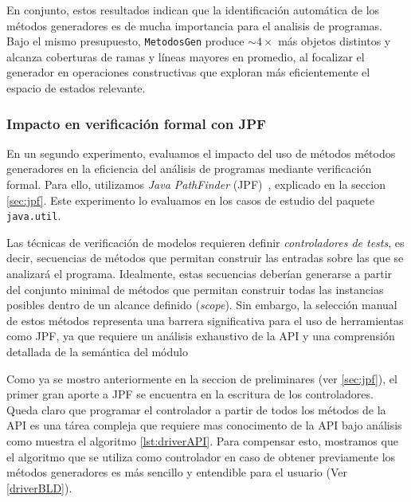 En conjunto, estos resultados indican que la identificación automática de
los métodos generadores es de mucha importancia para el analisis de programas.
Bajo el mismo presupuesto, \texttt{MetodosGen} produce \(\sim 4\times\)
más objetos distintos y alcanza coberturas de ramas y líneas mayores en promedio,
al focalizar el generador en operaciones constructivas que exploran más
eficientemente el espacio de estados relevante.



\subsubsection{Impacto en verificación formal con JPF}

En un segundo experimento, evaluamos el impacto del uso de métodos métodos generadores en la eficiencia 
del análisis de programas mediante verificación formal. Para ello, utilizamos \emph{Java PathFinder} 
(JPF)~\cite{Visser:2005}, explicado en la seccion \ref{sec:jpf}.
Este experimento lo evaluamos en los casos de estudio del paquete \texttt{java.util}.

Las técnicas de verificación de modelos requieren definir \emph{controladores de tests}, es decir, 
secuencias de métodos que permitan construir las entradas sobre las que se analizará el programa. 
Idealmente, estas secuencias deberían generarse a partir del conjunto minimal de métodos que permitan 
construir todas las instancias posibles dentro de un alcance definido (\emph{scope}). Sin embargo, 
la selección manual de estos métodos representa una barrera significativa para el uso de herramientas 
como JPF, ya que requiere un análisis exhaustivo de la API y una comprensión detallada de la 
semántica del módulo

Como ya se mostro anteriormente en la seccion de preliminares (ver \ref{sec:jpf}), el primer gran aporte a JPF se
encuentra en la escritura de los controladores. Queda claro que programar el controlador
a partir de todos los métodos de la API es una tárea compleja que requiere
mas conocimento de la API bajo análisis como muestra el algoritmo \ref{lst:driverAPI}. Para
compensar esto, mostramos que el algoritmo que se utiliza como controlador en caso
de obtener previamente los métodos generadores es más sencillo y entendible para el usuario (Ver \ref{driverBLD}).

